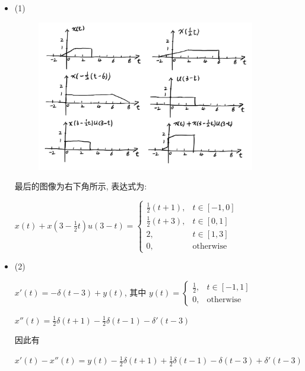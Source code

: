 \documentclass[a4paper,UTF8]{article}
\numberwithin{equation}{section}
\begin{document}
\begin{framed}
\begin{spacing}{1.5}
    \begin{itemize}
      \item (1)

      \begin{figure}[H]
        \centering
        \includegraphics[width=0.9\textwidth]{images/2022-11-17-16-22-51.png}
        \label{Fig.main1}
      \end{figure}
      
      最后的图像为右下角所示, 表达式为:
      
      $\displaystyle x(t) + x(3-\frac{1}{2}t)u(3-t) = \begin{cases}
      \frac{1}{2}(t+1), & t \in [-1, 0] \\
      \frac{1}{2}(t+3), & t \in [0, 1] \\
      2, & t \in [1, 3] \\
      0, & \text{otherwise}
      \end{cases}$
      
      \item (2)
      
      $\displaystyle x'(t) = -\delta(t-3) + y(t)$, 其中 $y(t) = \begin{cases}
      \frac{1}{2}, & t \in [-1, 1] \\
      0, & \text{otherwise}
      \end{cases}$
      
      $\displaystyle x''(t) = \frac{1}{2}\delta(t+1) - \frac{1}{2}\delta(t-1) - \delta'(t-3)$
      
      因此有
      
      $\displaystyle x'(t) - x''(t) = y(t) - \frac{1}{2}\delta(t+1) + \frac{1}{2}\delta(t-1) - \delta(t-3) + \delta'(t-3)$
      

\end{itemize}
\end{spacing}
\end{framed}
\end{document}
